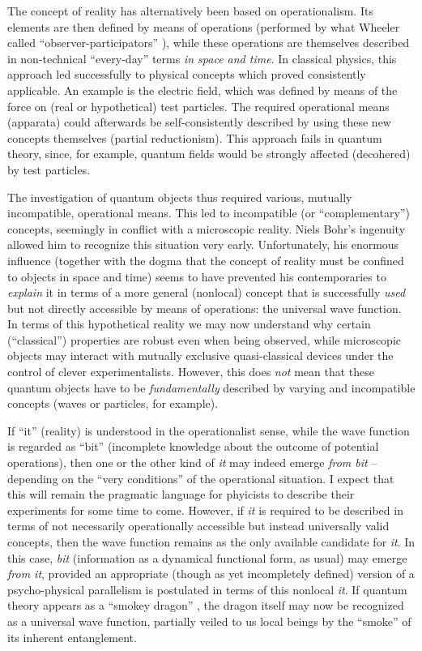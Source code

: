 \documentclass[12pt]{article}
\begin{document}
The concept of reality has alternatively been based on operationalism.
Its elements are then defined by means of operations (performed by what
Wheeler called ``observer-participators'' \cite{frontiers}), while
these operations are themselves described in non-technical
``every-day'' terms {\it in space and time}. In classical physics,
this approach led successfully to physical concepts which proved
consistently applicable. An example is the electric field, which was
defined by means of the force on (real or hypothetical) test
particles. The required operational means (apparata) could afterwards
be self-consistently described by using these new concepts
themselves (partial reductionism). This approach fails in quantum
theory, since, for example, quantum fields would be strongly affected
(decohered) by test particles.

The investigation of quantum objects thus required various, mutually
incompatible, operational means. This led to
incompatible (or ``complementary'') concepts, seemingly in
conflict with a microscopic reality.
Niels Bohr's ingenuity allowed him to recognize this situation very
early. Unfortunately, his enormous influence (together with the dogma
that the concept of reality must be confined to objects in space and
time) seems to have prevented his contemporaries to {\it explain} it in
terms of a more general (nonlocal) concept that is successfully {\it
used} but  not directly accessible by means of operations: the
universal wave function. In terms of this hypothetical reality  we may
now understand  why certain (``classical'') properties are robust even
when being observed, while microscopic objects may interact with
mutually exclusive quasi-classical devices under the control of clever
experimentalists. However, this does {\it not} mean that these quantum
objects have to be {\it fundamentally} described by varying and
incompatible concepts (waves or particles, for example).

If ``it'' (reality) is understood in the operationalist sense, while
the wave function is regarded as ``bit'' (incomplete knowledge
about the outcome of potential operations), then
one or the other kind of {\it it} may indeed emerge {\it from bit}
-- depending on the ``very conditions'' of the operational situation.
I expect that this will remain the pragmatic language  for
phyicists to describe their experiments for some time to come. However,
if {\it it} is required to be described in terms of  not necessarily
operationally accessible but instead universally valid concepts, then
the wave function remains as the only available candidate for {\it
it}. In this case, {\it bit} (information as a dynamical functional
form, as usual) may emerge {\it from it}, provided an appropriate
(though as yet incompletely defined) version of a psycho-physical
parallelism is postulated in terms of this nonlocal {\it it}.  If
quantum theory appears as a ``smokey dragon'' \cite{frontiers}, the
dragon itself may now be recognized as a universal wave function,
partially veiled to us local beings by the ``smoke'' of its inherent
entanglement.
\end{document}
